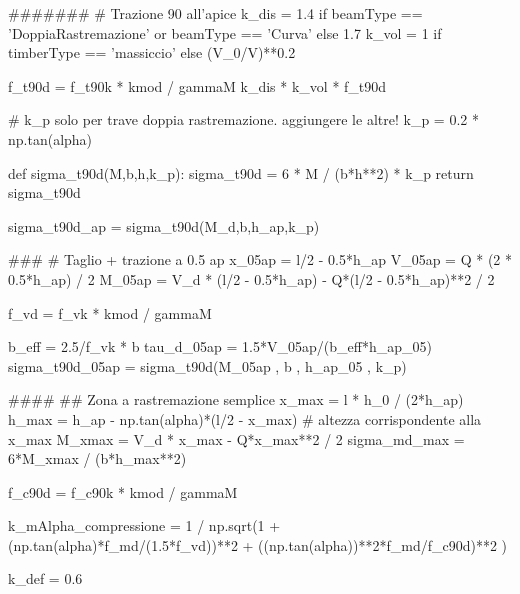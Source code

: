 \begin{pycode}[TraveDoppiaRastremazione]
#######
# Trazione 90 all'apice
k_dis =  1.4 if beamType == 'DoppiaRastremazione' or  beamType == 'Curva' else  1.7
k_vol = 1 if timberType == 'massiccio' else (V_0/V)**0.2 

f_t90d = f_t90k * kmod / gammaM
k_dis * k_vol * f_t90d

# k_p solo per trave doppia rastremazione. aggiungere le altre!
k_p = 0.2 * np.tan(alpha) 

def sigma_t90d(M,b,h,k_p):
    sigma_t90d = 6 * M / (b*h**2) * k_p
    return sigma_t90d

sigma_t90d_ap = sigma_t90d(M_d,b,h_ap,k_p)

###
# Taglio + trazione a 0.5 ap
x_05ap = l/2 - 0.5*h_ap
V_05ap = Q * (2 * 0.5*h_ap) / 2
M_05ap = V_d * (l/2 - 0.5*h_ap) - Q*(l/2 - 0.5*h_ap)**2 / 2

f_vd = f_vk * kmod / gammaM

b_eff = 2.5/f_vk * b
tau_d_05ap = 1.5*V_05ap/(b_eff*h_ap_05)
sigma_t90d_05ap = sigma_t90d(M_05ap , b , h_ap_05 , k_p)

####
## Zona a rastremazione semplice
x_max = l * h_0 / (2*h_ap)
h_max = h_ap - np.tan(alpha)*(l/2 - x_max) # altezza corrispondente alla x_max
M_xmax = V_d * x_max - Q*x_max**2 / 2
sigma_md_max = 6*M_xmax / (b*h_max**2)

f_c90d = f_c90k * kmod / gammaM

k_mAlpha_compressione = 1 / np.sqrt(1 + (np.tan(alpha)*f_md/(1.5*f_vd))**2 + ((np.tan(alpha))**2*f_md/f_c90d)**2 )

k_def = 0.6
\end{pycode}

